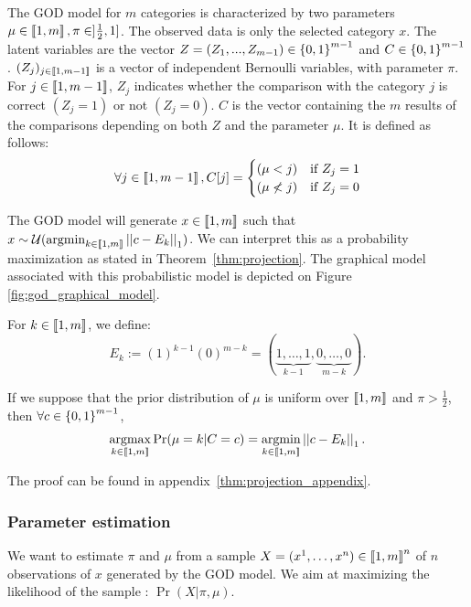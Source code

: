 The GOD model for $m$ categories is characterized by two parameters $\mu \in \left\llbracket1, m\right\rrbracket, \pi \in ]\frac{1}{2}, 1]$. The observed data is only the selected category $x$. The latent variables are the vector $Z = (Z_1,...,Z_{m-1}) \in \left\{ 0, 1 \right\}^{m - 1}$ and $C \in \left\{ 0, 1 \right\}^{m-1}$.
$(Z_j)_{j\in\left\llbracket1,m-1\right\rrbracket}$ is a vector of independent Bernoulli variables, with parameter $\pi$. For $j \in \left\llbracket1, m-1\right\rrbracket$, $Z_j$ indicates whether the comparison with the category $j$ is correct $(Z_j=1)$ or not $(Z_j=0)$. $C$ is the vector containing the $m$ results of the comparisons depending on both $Z$ and the parameter $\mu$. It is defined as follows:
\[
\forall j \in \left\llbracket1, m-1\right\rrbracket, C[j] = \begin{cases}
    (\mu < j) & \text{if}\  Z_j = 1\\
    (\mu \not< j) & \text{if}\  Z_j = 0
\end{cases} \]

The GOD model will generate $x \in \left\llbracket1, m\right\rrbracket$ such that $x \sim \mathcal{U}(\operatorname*{argmin}_{k \in \left\llbracket1, m\right\rrbracket} \left|\left|c - E_k\right|\right|_1)$. We can interpret this as a probability maximization as stated in Theorem~\ref{thm:projection}. The graphical model associated with this probabilistic model is depicted on Figure \ref{fig:god_graphical_model}.


\begin{definition}
    For $k \in \left\llbracket1, m\right\rrbracket$, we define:
    \[E_k := (1)^{k-1} (0)^{m - k} = (\underset{k-1}{\underbrace{1, \dots, 1}}, \underset{m - k}{\underbrace{0, \dots, 0}} ). \]
\end{definition}


\begin{thm}
    \label{thm:projection}
    If we suppose that the prior distribution of $\mu$ is uniform over $\left\llbracket1, m\right\rrbracket$ and $\pi > \frac{1}{2}$, then \(\forall c \in \left\{ 0, 1 \right\}^{m-1}\),
    \[\operatorname*{argmax}_{k \in \left\llbracket1, m\right\rrbracket} \Pr(\mu = k | C = c) = \operatorname*{argmin}_{k \in \left\llbracket1, m\right\rrbracket} \left|\left|c - E_k\right|\right|_1.\]
\end{thm}

The proof can be found in appendix~\ref{thm:projection_appendix}.

\subsubsection{Parameter estimation}

We want to estimate $\pi$ and $\mu$ from a sample $X = (x^1, \dots, x^n) \in \left\llbracket1, m\right\rrbracket^n$ of $n$ observations of $x$ generated by the GOD model. We aim at maximizing the likelihood of the sample : $\Pr(X | \pi, \mu)$. 


